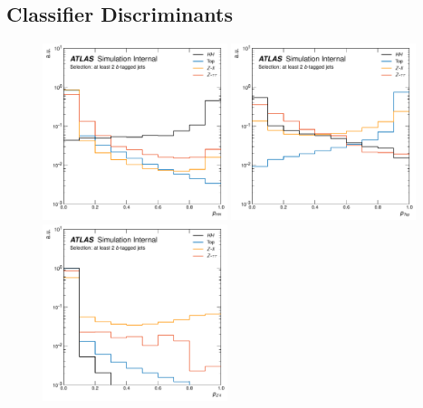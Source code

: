%
%

\subsection{Classifier Discriminants}
\label{sec:nn_discriminants}

\begin{figure}[!htb]
    \begin{center}
        \includegraphics[width=0.48\textwidth]{figures/search_hh/nn_disc/pi_plot_NN_p_hh}
        \includegraphics[width=0.48\textwidth]{figures/search_hh/nn_disc/pi_plot_NN_p_top}
        \includegraphics[width=0.48\textwidth]{figures/search_hh/nn_disc/pi_plot_NN_p_zsf}

\end{center}
\end{figure}
